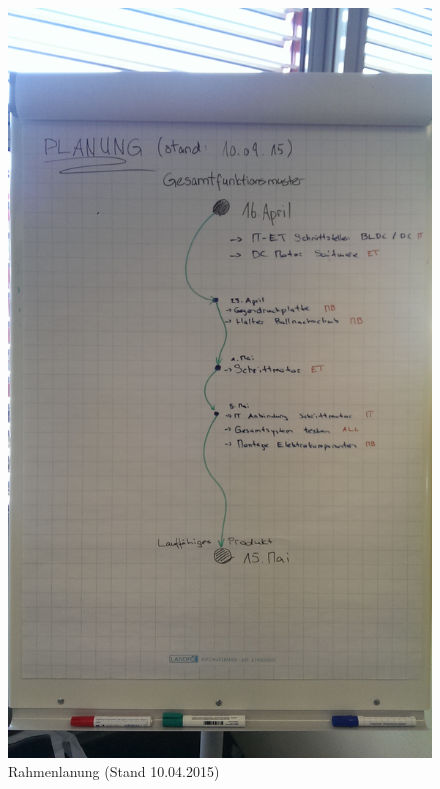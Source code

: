 \begin{figure}[h!]
	\centering
	\includegraphics[width=0.6\linewidth]{../../fig/rahmenplanung-10042015}
	\caption{Rahmenlanung (Stand 10.04.2015)}
	\label{fig:rahmenplanung-10042015}
\end{figure}


